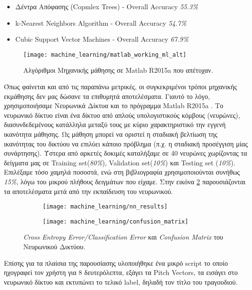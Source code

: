 \begin{itemize}
	\item Δέντρα Απόφασης (Copmlex Trees) - Overall Accuracy \textit{55.3\%}
	\item k-Nearest Neighbors Algorithm 	- Overall Accuracy \textit{54.7\%}
	\item Cubic Support Vector Machines	- Overall Accuracy \textit{67.9\%}
\end{itemize}

\begin{figure}
	\centering
	\vspace{-20pt}\texttt{[image: machine\_learning/matlab\_working\_ml\_alt]}
	\vspace{-20pt}\caption{Αλγόριθμοι Μηχανικής μάθησης σε Matlab R2015a \cite{matlab} που απέτυχαν.}
	\label{fig:matlab_ml_alg}
\end{figure}

Όπως φαίνεται και από τις παραπάνω μετρικές, οι συγκεκριμένοι τρόποι μηχανικής εκμάθησης δεν μας δώσανε τα επιθυμητά αποτελέσματα. Γιαυτό το λόγο, χρησιμοποιήσαμε Νευρωνικά Δίκτυα και το πρόγραμμα Matlab R2015a \cite{matlab}. Το νευρωνικό δίκτυο είναι ένα δίκτυο από απλούς υπολογιστικούς κόμβους (νευρώνες), διασυνδεδεμένους κατάλληλα μεταξύ τους με κύριο χαρακτηριστικό την εγγενή ικανότητα μάθησης. Ως μάθηση μπορεί να οριστεί η σταδιακή βελτίωση της ικανότητας του δικτύου να επιλύει κάποιο πρόβλημα (π.χ. η σταδιακή προσέγγιση μίας συνάρτησης)\cite{neural_net}. Ύστερα από αρκετές δοκιμές καταλήξαμε σε 40 νευρώνες χωρίζοντας τα δείγματα μας σε Training set(\textit{80\%}), Validation set(\textit{10\%}) και Testing set (\textit{10\%}). Επιλέξαμε τόσο χαμηλά ποσοστά, ενώ στη βιβλιογραφία χρησιμοποιούνται συνήθως \textit{15\%}, λόγω του μικρού πλήθους δειγμάτων που είχαμε. Στην εικόνα \ref{fig:matlab-results} παρουσιάζονται τα αποτελέσματα μετά από την εκπαίδευση του νευρωνικού.

\begin{figure}[htb]
	\centering
	\begin{subfigure}{0.5\linewidth}
		\texttt{[image: machine\_learning/nn\_results]}
	\end{subfigure}\hfill
	\begin{subfigure}{\linewidth}
		\texttt{[image: machine\_learning/confusion\_matrix]}
	\end{subfigure}
	\caption{\textit{Cross Entropy Error/Classification Error} και \textit{Confusion Matrix} του Νευρωνικού Δικτύου.}
	\label{fig:matlab-results}
\end{figure}

Επίσης για τα πλαίσια της παρουσίασης υλοποιήθηκε ένα μικρό script το οποίο ηχογραφεί τον χρήστη για 8 δευτερόλεπτα, εξάγει τα Pitch Vectors, τα εισάγει στο νευρωνικό δίκτυο και εκτυπώνει το τελικό label, δηλαδή τον τίτλο του τραγουδιού.